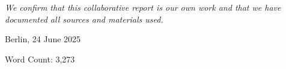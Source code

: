 \chapter*{}
\vspace{17cm}
\hfill\parbox{8cm}{
\raggedleft
	\textit{We confirm that this collaborative report is our own work and that we have documented all sources and materials used.}\par 
	\vspace{1em}
	Berlin, 24 June 2025

	\vspace{3em}
	{\footnotesize Word Count: 3,273}
}
\thispagestyle{empty}
